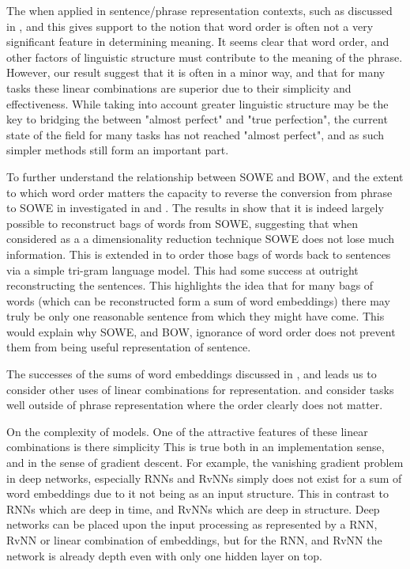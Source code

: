 \documentclass{book}
\begin{document}
The when applied in sentence/phrase representation contexts,
such as discussed in , and 
this gives support to the notion that word order is often not a very significant feature in determining meaning.
It seems clear that word order, and other factors of linguistic structure must contribute to the meaning of the phrase.
However, our result suggest that it is often in a minor way, and that for many tasks these linear combinations are superior due to their simplicity and effectiveness.
While taking into account greater linguistic structure may be the key to bridging the between "almost perfect" and "true perfection", the current state of the field for many tasks has not reached "almost perfect", and as such simpler methods still form an important part.

To further understand the relationship between SOWE and BOW, and the extent to which word order matters the capacity to reverse the conversion from phrase to SOWE in investigated in  and .
The results in  show that it is indeed largely possible to reconstruct bags of words from SOWE, suggesting that when considered as a a dimensionality reduction technique SOWE does not lose much information.
This is extended in  to order those bags of words back to sentences via a simple tri-gram language model.
This had some success at outright reconstructing the sentences.
This highlights the idea that for many  bags of words (which can be reconstructed form a sum of word embeddings) there may truly be only one reasonable sentence from which they might have come.
This would explain why SOWE, and BOW, ignorance of word order does not prevent them from being useful representation of sentence.


The successes of the sums of word embeddings discussed in , and  leads us to consider other uses of linear combinations for representation.
 and  consider tasks well outside of phrase representation where the order clearly does not matter.




On the complexity of models.
One of the attractive features of these linear combinations is there simplicity
This is true both in an implementation sense, and in the sense of gradient descent.
For example, the vanishing gradient problem in deep networks, especially RNNs and RvNNs
simply does not exist for a sum of word embeddings due to it not being as an input structure.
This in contrast to RNNs which are deep in time, and RvNNs which are deep in structure.
Deep networks can be placed upon the input processing as represented by a RNN, RvNN or linear combination of embeddings,
but for the RNN, and RvNN the network is already depth even with only one hidden layer on top.
\end{document}
